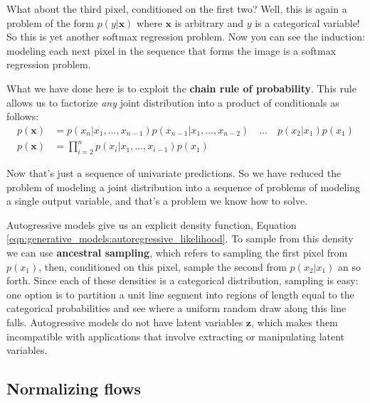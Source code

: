 What about the third pixel, conditioned on the first two? Well, this is again a problem of the form $p(y | \mathbf{x})$ where $\mathbf{x}$ is arbitrary and $y$ is a categorical variable! So this is yet another softmax regression problem. Now you can see the induction: modeling each next pixel in the sequence that forms the image is a softmax regression problem.


What we have done here is to exploit the {\bf chain rule of probability}. This rule allows us to factorize \textit{any} joint distribution into a product of conditionals as follows:
\begin{align}
    p(\mathbf{x}) &= p(x_n | x_1, \ldots, x_{n-1})p(x_{n-1} | x_1, \ldots, x_{n-2}) \quad \ldots \quad p(x_2|x_1)p(x_1)\\
    p(\mathbf{x}) &= \prod_{i=2}^n p(x_i | x_1, \ldots, x_{i-1})p(x_1)\label{eqn:generative_models:autoregressive_likelihood}
\end{align}

Now that's just a sequence of univariate predictions. So we have reduced the problem of modeling a joint distribution into a sequence of problems of modeling a single output variable, and that's a problem we know how to solve.

Autogressive models give us an explicit density function, Equation \ref{eqn:generative_models:autoregressive_likelihood}. To sample from this density we can use {\bf ancestral sampling}, which refers to sampling the first pixel from $p(x_1)$, then, conditioned on this pixel, sample the second from $p(x_2|x_1)$ an so forth. Since each of these densities is a categorical distribution, sampling is easy: one option is to partition a unit line segment into regions of length equal to the categorical probabilities and see where a uniform random draw along this line falls. Autogressive models do not have latent variables $\mathbf{z}$, which makes them incompatible with applications that involve extracting or manipulating latent variables.



\subsection{Normalizing flows}

